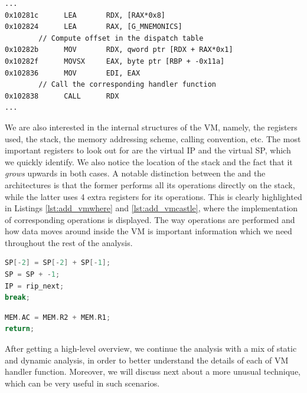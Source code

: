 \begin{lstlisting}[label={lst:indirect_call_vmcastle}, caption={x86\_64 disassembly of the \cc{vmcastle} dispatcher. The function handler corresponding to the current opcode is indirectly called through the register \cc{RDX}.}]
...
0x10281c      LEA       RDX, [RAX*0x8]
0x102824      LEA       RAX, [G_MNEMONICS]
        // Compute offset in the dispatch table
0x10282b      MOV       RDX, qword ptr [RDX + RAX*0x1] 
0x10282f      MOVSX     EAX, byte ptr [RBP + -0x11a]
0x102836      MOV       EDI, EAX
        // Call the corresponding handler function
0x102838      CALL      RDX  
...
\end{lstlisting}

We are also interested in the internal structures of the \gls{VM}, namely, the registers used, the stack, the memory addressing scheme, calling convention, etc. The most important registers to look out for are the virtual \gls{IP} and the virtual \gls{SP}, which we quickly identify. We also notice the location of the stack and the fact that it \emph{grows} upwards in both cases. A notable distinction between the  and the  architectures is that the former performs all its operations directly on the stack, while the latter uses 4 extra registers for its operations. This is clearly highlighted in Listings \ref{lst:add_vmwhere} and \ref{lst:add_vmcastle}, where the implementation of corresponding  operations is displayed. The way operations are performed and how data moves around inside the \gls{VM} is important information which we need throughout the rest of the analysis.

\begin{multicols}{2}
    \begin{lstlisting}[language=c, label={lst:add_vmwhere}, caption={Stack-based implementation of a simple \cc{add} instruction in the \cc{vmwhere} architecture.}]
SP[-2] = SP[-2] + SP[-1];
SP = SP + -1;
IP = rip_next;
break;
\end{lstlisting}
\columnbreak
\begin{lstlisting}[language=c, label={lst:add_vmcastle}, caption={Register-based implementation of a simple \cc{add} instruction in the \cc{vmcastle} architecture.}]
MEM.AC = MEM.R2 + MEM.R1;
return;
\end{lstlisting}
\end{multicols}

After getting a high-level overview, we continue the analysis with a mix of static and dynamic analysis, in order to better understand the details of each of \gls{VM} handler function. Moreover, we will discuss next about a more unusual technique, which can be very useful in such scenarios.

